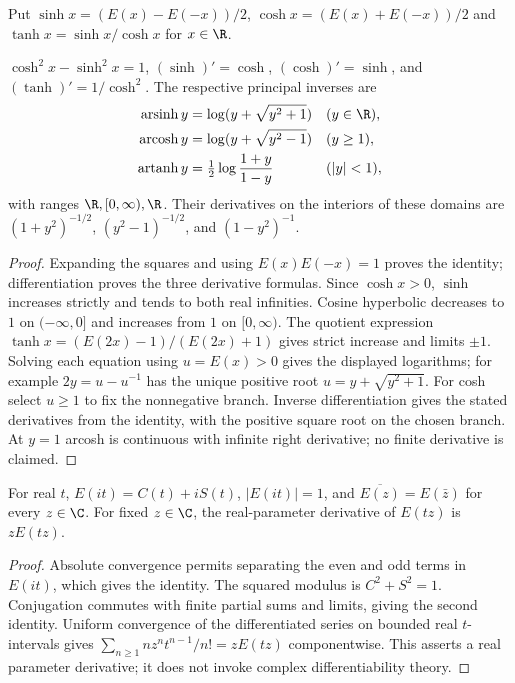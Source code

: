 \begin{definition}
Put $\sinh x=(E(x)-E(-x))/2$, $\cosh x=(E(x)+E(-x))/2$ and
$\tanh x=\sinh x/\cosh x$ for $x\in\R$.
\end{definition}
\begin{proposition}
$\cosh^2x-\sinh^2x=1$, $(\sinh)'=\cosh$, $(\cosh)'=\sinh$,
and $(\tanh)'=1/\cosh^2$. The respective principal inverses are
\begin{align*}
\operatorname{arsinh}y&=\log(y+\sqrt{y^2+1})&& (y\in\R),\\
\operatorname{arcosh}y&=\log(y+\sqrt{y^2-1})&& (y\ge1),\\
\operatorname{artanh}y&=\tfrac12\log\frac{1+y}{1-y}&& (|y|<1),
\end{align*}
with ranges $\R,[0,\infty),\R$. Their derivatives on the interiors
of these domains are $(1+y^2)^{-1/2}$, $(y^2-1)^{-1/2}$,
and $(1-y^2)^{-1}$.
\end{proposition}
\begin{proof}
Expanding the squares and using $E(x)E(-x)=1$ proves the identity;
differentiation proves the three derivative formulas. Since $\cosh x>0$,
$\sinh$ increases strictly and tends to both real infinities. Cosine
hyperbolic decreases to $1$ on $(-\infty,0]$ and increases from $1$ on
$[0,\infty)$. The quotient expression
$\tanh x=(E(2x)-1)/(E(2x)+1)$ gives strict increase and limits $\pm1$.
Solving each equation using $u=E(x)>0$ gives the displayed logarithms;
for example $2y=u-u^{-1}$ has the unique positive root
$u=y+\sqrt{y^2+1}$. For cosh select $u\ge1$ to fix the nonnegative branch.
Inverse differentiation gives the stated derivatives from the identity,
with the positive square root on the chosen branch. At $y=1$ arcosh
is continuous with infinite right derivative; no finite derivative is claimed.
\end{proof}

\begin{theorem}
For real $t$, $E(it)=C(t)+iS(t)$, $|E(it)|=1$, and
$\overline{E(z)}=E(\bar z)$ for every $z\in\C$. For fixed $z\in\C$,
the real-parameter derivative of $E(tz)$ is $zE(tz)$.
\end{theorem}
\begin{proof}
Absolute convergence permits separating the even and odd terms in $E(it)$,
which gives the identity. The squared modulus is $C^2+S^2=1$.
Conjugation commutes with finite partial sums and limits, giving the second
identity. Uniform convergence of the differentiated series on bounded real
$t$-intervals gives
$\sum_{n\ge1}nz^nt^{n-1}/n!=zE(tz)$ componentwise. This asserts a real
parameter derivative; it does not invoke complex differentiability theory.
\end{proof}

